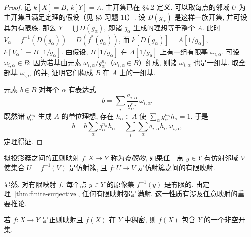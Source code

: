 \begin{proof}
	记 $k[X] = B$, $k[Y] = A$. 主开集已在 §4.2 定义. 可以取每点的邻域 $U$ 为主开集且满足定理的假设（见 §5 习题 11）. 设 $D(g_\alpha)$ 是这样一族开集, 并可设其为有限族. 那么 $Y = \bigcup D(g_\alpha)$, 即诸 $g_\alpha$ 生成的理想等于整个 $A$. 此时 $V_\alpha = f^{-1}(D(g_\alpha)) = D(f^*(g_\alpha))$, 而 $k[D(g_\alpha)] = A[1/g_\alpha]$, $k[V_\alpha] = B[1/g_\alpha]$. 由假设, $B[1/g_\alpha]$ 在 $A[1/g_\alpha]$ 上有一组有限基 $\omega_{i,\alpha}$. 可设 $\omega_{i,\alpha} \in B$: 因为若基由元素 $\omega_{i,\alpha}/g_\alpha^{n_i}$（$\omega_{i,\alpha} \in B$）组成, 则诸 $\omega_{i,\alpha}$ 也是一组基. 取全部基 $\omega_{i,\alpha}$ 的并, 证明它们构成 $B$ 在 $A$ 上的一组基.

	元素 $b \in B$ 对每个 $\alpha$ 有表达式
	\[
		b = \sum_i \frac{a_{i,\alpha}}{g_\alpha^{n_\alpha}}\, \omega_{i,\alpha}.
	\]
	既然诸 $g_\alpha^{n_\alpha}$ 生成 $A$ 的单位理想, 存在 $h_\alpha \in A$ 使 $\sum_\alpha g_\alpha^{n_\alpha} h_\alpha = 1$. 于是
	\[
		b = b \sum_\alpha g_\alpha^{n_\alpha} h_\alpha = \sum_i \sum_\alpha a_{i,\alpha} h_\alpha\, \omega_{i,\alpha},
	\]
	定理得证.
\end{proof}

\begin{definition}[拟投影簇间的有限映射]\label{def:finite-map-quasi}
	拟投影簇之间的正则映射 $f: X \to Y$ 称为\emph{有限的}, 如果任一点 $y \in Y$ 有仿射邻域 $V$ 使集合 $U = f^{-1}(V)$ 是仿射簇, 且 $f: U \to V$ 是仿射簇之间的有限映射.
\end{definition}

显然, 对有限映射 $f$, 每个点 $y \in Y$ 的原像集 $f^{-1}(y)$ 是有限的. 由定理~\ref{thm:finite-surjective}, 任何有限映射都是满射. 这一性质有涉及任意映射的重要推论.

\begin{theorem}\label{thm:dense-contains-open}
	若 $f: X \to Y$ 是正则映射且 $f(X)$ 在 $Y$ 中稠密, 则 $f(X)$ 包含 $Y$ 的一个非空开集.
\end{theorem}

